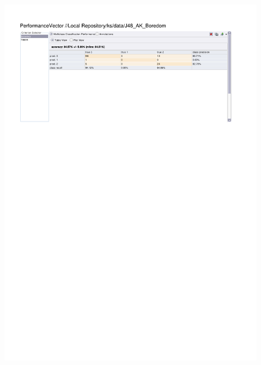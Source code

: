 \begin{figure}[htp]
  \centerline{\includegraphics[trim=0 680 0 60,clip,width=16.09cm]{results/J48_A_Boredom.pdf}} \caption{
} \label{J48_A_Boredom}
\end{figure}

